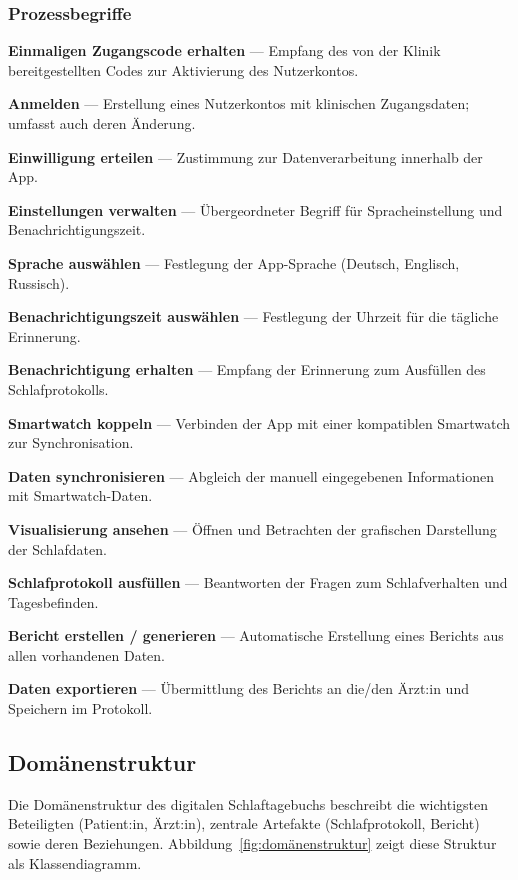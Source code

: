 \subsubsection{Prozessbegriffe}
\textbf{Einmaligen Zugangscode erhalten} — Empfang des von der Klinik bereitgestellten Codes zur Aktivierung des Nutzerkontos.

\textbf{Anmelden} — Erstellung eines Nutzerkontos mit klinischen Zugangsdaten; umfasst auch deren Änderung.

\textbf{Einwilligung erteilen} — Zustimmung zur Datenverarbeitung innerhalb der App. 

\textbf{Einstellungen verwalten} — Übergeordneter Begriff für Spracheinstellung und Benachrichtigungszeit.

\textbf{Sprache auswählen} — Festlegung der App-Sprache (Deutsch, Englisch, Russisch).

\textbf{Benachrichtigungszeit auswählen} — Festlegung der Uhrzeit für die tägliche Erinnerung.

\textbf{Benachrichtigung erhalten} — Empfang der Erinnerung zum Ausfüllen des Schlafprotokolls.

\textbf{Smartwatch koppeln} — Verbinden der App mit einer kompatiblen Smartwatch zur Synchronisation.

\textbf{Daten synchronisieren} — Abgleich der manuell eingegebenen Informationen mit Smartwatch-Daten.

\textbf{Visualisierung ansehen} — Öffnen und Betrachten der grafischen Darstellung der Schlafdaten.

\textbf{Schlafprotokoll ausfüllen} — Beantworten der Fragen zum Schlafverhalten und Tagesbefinden.

\textbf{Bericht erstellen / generieren} — Automatische Erstellung eines Berichts aus allen vorhandenen Daten.

\textbf{Daten exportieren} — Übermittlung des Berichts an die/den Ärzt:in und Speichern im Protokoll.

\newpage

\subsection{Domänenstruktur}

Die Domänenstruktur des digitalen Schlaftagebuchs beschreibt die wichtigsten Beteiligten
(Patient:in, Ärzt:in), zentrale Artefakte (Schlafprotokoll, Bericht) sowie deren
Beziehungen. Abbildung~\ref{fig:domänenstruktur} zeigt diese Struktur als Klassendiagramm.

